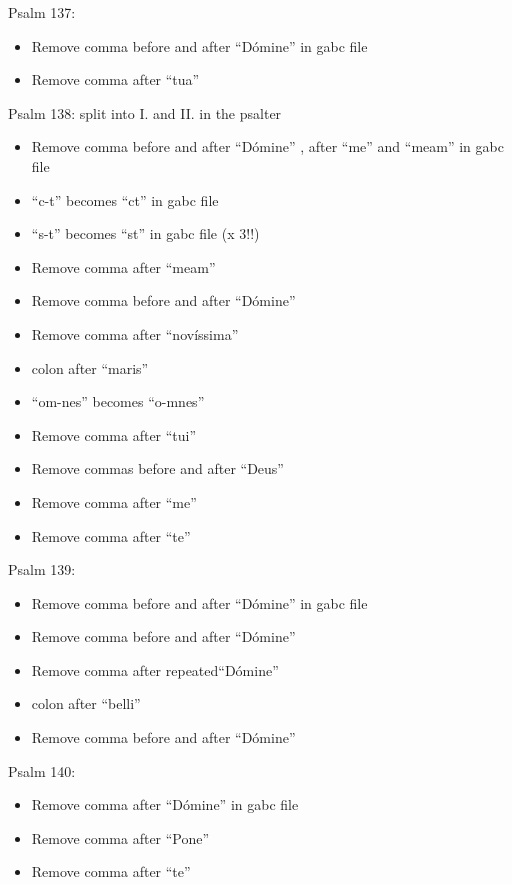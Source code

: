 \documentclass[11pt]{article}
\begin{document}
      Psalm 137:
  \begin{itemize}
  \item Remove comma before and after ``Dómine'' in gabc file
  \item  Remove comma after ``tua''
    \end{itemize}

      Psalm 138: split into I. and II. in the psalter
  \begin{itemize}
    \item Remove comma before and after ``Dómine'' , after ``me'' and ``meam'' in gabc file
    \item
    ``c-t'' becomes ``ct'' in gabc file
       \item
    ``s-t'' becomes ``st'' in gabc file (x 3!!)
    \item
    Remove comma after ``meam''
  \item Remove comma before and after ``Dómine'' 
  \item  Remove comma after ``novíssima''
  \item
  colon after ``maris''
  \item
   ``om-nes'' becomes  ``o-mnes''
  \item Remove comma after ``tui''
  \item
  
  Remove commas before and after ``Deus''
  \item Remove comma after ``me''
   \item Remove comma after ``te''
  
    \end{itemize}

Psalm 139:
  \begin{itemize}
  \item Remove comma before and after ``Dómine'' in gabc file
  \item  Remove comma before and after ``Dómine'' 
  \item  Remove comma after repeated``Dómine'' 
 \item colon after ``belli''
  \item Remove comma before and after ``Dómine'' 
    \end{itemize}

Psalm 140:
  \begin{itemize}
  \item  Remove comma after ``Dómine'' in gabc file
  \item  Remove comma after ``Pone''
 \item
 Remove comma after ``te''
    \end{itemize}
\end{document}
